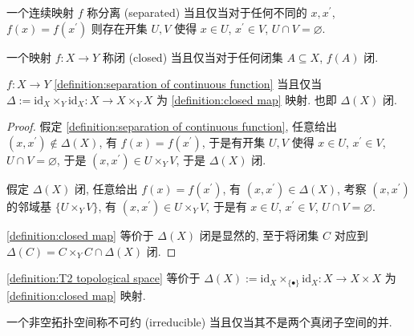 \begin{definition}[分离]
    \label {definition:separation of continuous function}
    一个连续映射 \(f\) 称分离 (separated) 当且仅当对于任何不同的 \(x,x^\prime\), \(f (x) = f (x^\prime)\) 
    则存在开集 \(U,V\) 使得 \(x \in U\), \(x^\prime \in V\), \(U \cap V = \varnothing\).
\end{definition}

\begin{definition}[闭映射]
    \label {definition:closed map}
    一个映射 \(f : X \to Y\) 称闭 (closed) 当且仅当对于任何闭集 \(A \subseteq X\), \(f (A)\) 闭.
\end{definition}

\begin{lemma}
    \(f : X \to Y\) \ref{definition:separation of continuous function} 当且仅当 \(\Delta := \mathrm{id}_X \times_Y \mathrm{id}_X : X \to X \times_Y X\) 为 \ref{definition:closed map} 映射.
    也即 \(\Delta (X)\) 闭.

    \begin{proof}
        假定 \ref{definition:separation of continuous function}, 任意给出 \((x,x^\prime) \notin \Delta (X)\), 有 \(f (x) = f (x^\prime)\), 
        于是有开集 \(U,V\) 使得 \(x \in U\), \(x^\prime \in V\), \(U \cap V = \varnothing\), 于是 \((x,x^\prime) \in U \times_Y V\), 于是 \(\Delta (X)\) 闭.

        假定 \(\Delta (X)\) 闭, 任意给出 \(f (x) = f (x^\prime)\), 有 \((x,x^\prime) \in \Delta (X)\), 考察 \((x,x^\prime)\)
        的邻域基 \(\{U \times_Y V\}\), 有 \((x,x^\prime) \in U \times_Y V\), 于是有 \(x \in U\), \(x^\prime \in V\), \(U \cap V = \varnothing\).

        \ref{definition:closed map} 等价于 \(\Delta (X)\) 闭是显然的, 至于将闭集 \(C\) 对应到 \(\Delta (C) = C \times_Y C \cap \Delta (X)\) 闭.
    \end{proof}
\end{lemma}

\begin{corollary}
    \ref{definition:T2 topological space} 等价于 \(\Delta (X) := \mathrm{id}_X \times_{\{\bullet\}} \mathrm{id}_X : X \to X \times X\) 为 \ref{definition:closed map} 映射.
\end{corollary}

\begin{definition}[不可约]
    \label {definition:irreducible topological space}
    一个非空拓扑空间称不可约 (irreducible) 当且仅当其不是两个真闭子空间的并.
\end{definition}

